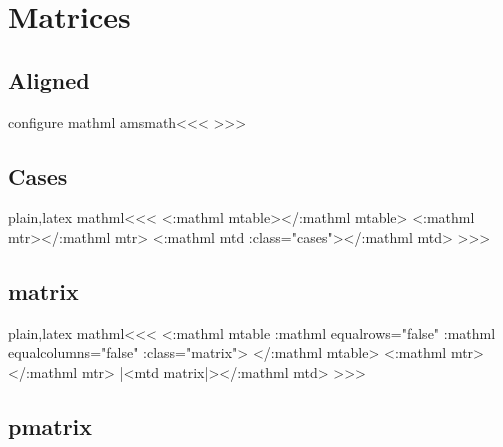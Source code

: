 {{{{{{%
\section{Matrices}

\subsection{Aligned}



\<configure mathml amsmath\><<<
   {}  
   {}  
   {}   {}  
   {}
   {} 
   {}
   {}
   {}   {}
   {}
   {}
>>>



\subsection{Cases}

\<plain,latex mathml\><<<
    {}{} {\Tg<\a:mathml mtable>}{\Tg</\a:mathml mtable>}
    {\Tg<\a:mathml mtr>}{\Tg</\a:mathml mtr>}
    {\Tg<\a:mathml mtd \mml:class="cases">}{\Tg</\a:mathml mtd>}
>>>


\subsection{matrix}

\<plain,latex mathml\><<<
   {\Tg<\a:mathml mtable 
        \a:mathml equalrows="false" \a:mathml equalcolumns="false"\Hnewline
          \mml:class="matrix">} 
   {\Tg</\a:mathml mtable>}
   {\Tg<\a:mathml mtr>}{\Tg</\a:mathml mtr>}
   {|<mtd matrix|>}{\Tg</\a:mathml mtd>}
>>>



\subsection{pmatrix}


}}}}}}
